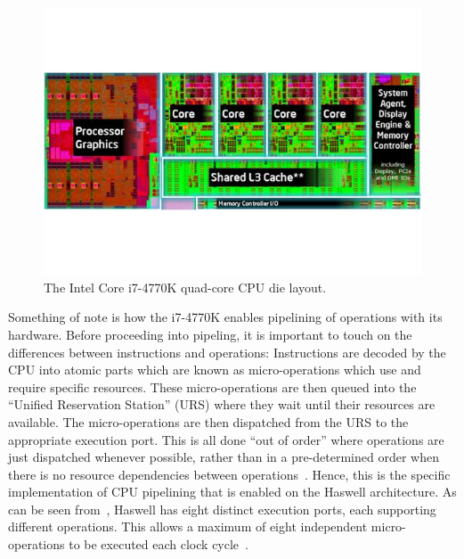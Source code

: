 \documentclass[a4paper,11pt]{article}
\begin{document}
\begin{figure}[ht]
  \centering
  \includegraphics[scale=0.5]{img/haswell-layout}
  \caption{The Intel Core i7-4770K quad-core CPU die layout.~\cite{web:TomHWCorei7DiePic}}
\label{fig:haswell-layout}
\end{figure}

Something of note is how the i7-4770K enables pipelining of operations with its hardware. Before proceeding into pipeling, it is important to touch on the differences between instructions and operations: Instructions are decoded by the CPU into atomic parts which are known as micro-operations which use and require specific resources. These micro-operations are then queued into the ``Unified Reservation Station'' (URS) where they wait until their resources are available. The micro-operations are then dispatched from the URS to the appropriate execution port. This is all done ``out of order'' where operations are just dispatched whenever possible, rather than in a pre-determined order when there is no resource dependencies between operations~\cite{book:Corei7PerfAnalysis}. Hence, this is the specific implementation of CPU pipelining that is enabled on the Haswell architecture. As can be seen from~, Haswell has eight distinct execution ports, each supporting different operations. This allows a maximum of eight independent micro-operations to be executed each clock cycle~\cite{web:TomsHWCorei7}.
\end{document}
